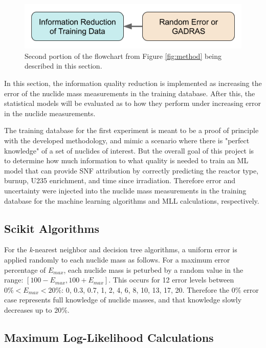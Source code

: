 \begin{figure}[H]
  \centering
  \includegraphics[width=0.7\linewidth]{./chapters/exp1/methodology2.png}
  \caption{Second portion of the flowchart from Figure \ref{fig:method} being 
           described in this section.}
\end{figure}

In this section, the information quality reduction is implemented as increasing
the error of the nuclide mass measurements in the training database. After
this, the statistical models will be evaluated as to how they perform under
increasing error in the nuclide measurements. 

The training database for the first experiment is meant to be a proof of
principle with the developed methodology, and mimic a scenario where there is
"perfect knowledge" of a set of nuclides of interest.  But the overall goal of
this project is to determine how much information to what quality is needed to
train an \gls{ML} model that can provide \gls{SNF} attribution by correctly
predicting the reactor type, burnup, \gls{U235} enrichment, and time since
irradiation.  Therefore error and uncertainty were injected into the nuclide
mass measurements in the training database for the machine learning algorithms
and \gls{MLL} calculations, respectively. 

\subsection{Scikit Algorithms}

For the \textit{k}-nearest neighbor and decision tree algorithms, a uniform
error is applied randomly to each nuclide mass as follows.  For a maximum error
percentage of $E_{max}$, each nuclide mass is peturbed by a random value in the
range: $[100-E_{max},100+E_{max}]$.  This occurs for 12 error levels between
$0\% < E_{max} < 20\%$: 0, 0.3, 0.7, 1, 2, 4, 6, 8, 10, 13, 17, 20.  Therefore
the $0\%$ error case represents full knowledge of nuclide masses, and that
knowledge slowly decreases up to $20\%$. 

\subsection{Maximum Log-Likelihood Calculations}

